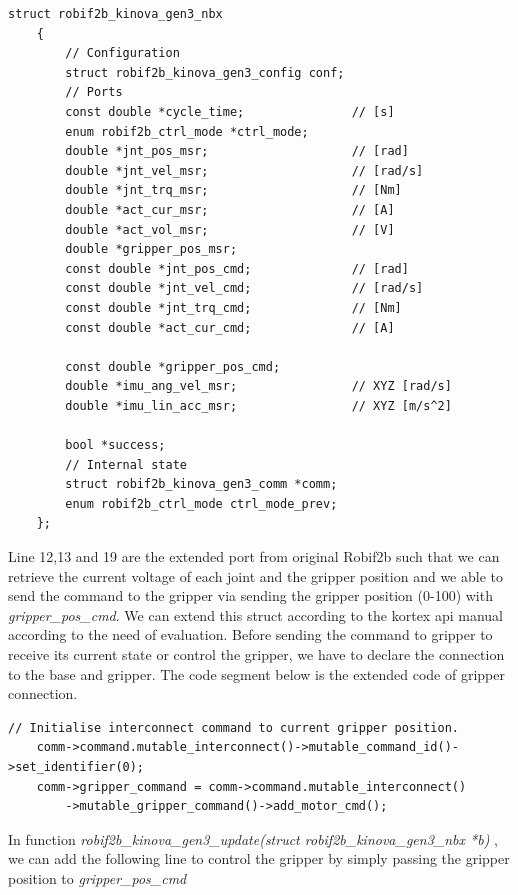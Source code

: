 \documentclass[report.tex]{subfiles}
\begin{document}
    \begin{lstlisting}[caption = {Struct of the enabled ports for base and actuator of Kinova kortex api in Robif2b},label={lst:Robif2b}]
    struct robif2b_kinova_gen3_nbx
    {
        // Configuration
        struct robif2b_kinova_gen3_config conf;
        // Ports
        const double *cycle_time;               // [s]
        enum robif2b_ctrl_mode *ctrl_mode;
        double *jnt_pos_msr;                    // [rad]
        double *jnt_vel_msr;                    // [rad/s]
        double *jnt_trq_msr;                    // [Nm]
        double *act_cur_msr;                    // [A]
        double *act_vol_msr;                    // [V]
        double *gripper_pos_msr;
        const double *jnt_pos_cmd;              // [rad]
        const double *jnt_vel_cmd;              // [rad/s]
        const double *jnt_trq_cmd;              // [Nm]
        const double *act_cur_cmd;              // [A]

        const double *gripper_pos_cmd;  
        double *imu_ang_vel_msr;                // XYZ [rad/s]
        double *imu_lin_acc_msr;                // XYZ [m/s^2]
        
        bool *success;
        // Internal state
        struct robif2b_kinova_gen3_comm *comm;
        enum robif2b_ctrl_mode ctrl_mode_prev;
    };
\end{lstlisting}
Line 12,13 and 19 are the extended port from original Robif2b such that we can retrieve the current voltage of each joint and the gripper position and we able to send the command to the gripper via sending the gripper position (0-100) with \textit{gripper\_pos\_cmd}. We can extend this struct according to the kortex api manual \cite{Kinovaapi} according to the need of evaluation.
Before sending the command to gripper to receive its current state or control the gripper, we have to declare the connection to the base and gripper. The code segment below is the extended code of gripper connection.
\begin{lstlisting}[caption = {Establish connection between base and gripper},label={lst:Robif2b_gripper}]
    // Initialise interconnect command to current gripper position.
    comm->command.mutable_interconnect()->mutable_command_id()->set_identifier(0);
    comm->gripper_command = comm->command.mutable_interconnect()
        ->mutable_gripper_command()->add_motor_cmd();
\end{lstlisting}

In function \textit{robif2b\_kinova\_gen3\_update(struct robif2b\_kinova\_gen3\_nbx *b)} , we can add the following line to control the gripper by simply passing the gripper position to \textit{gripper\_pos\_cmd} 
\end{document}
